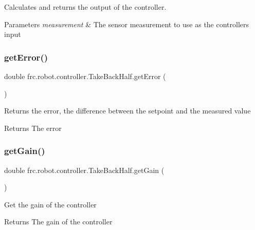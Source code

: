 Calculates and returns the output of the controller.


\begin{DoxyParams}{Parameters}
{\em measurement} & The sensor measurement to use as the controller\textquotesingle{}s input \\
\hline
\end{DoxyParams}
\mbox{\label{classfrc_1_1robot_1_1controller_1_1_take_back_half_a83f8b0c4e447e4d59f84bd8b9e6ac6d6}} 
\subsubsection{\texorpdfstring{getError()}{getError()}}
{\footnotesize\ttfamily double frc.\+robot.\+controller.\+Take\+Back\+Half.\+get\+Error (\begin{DoxyParamCaption}{ }\end{DoxyParamCaption})\hspace{0.3cm}{\ttfamily [inline]}}

Returns the error, the difference between the setpoint and the measured value

\begin{DoxyReturn}{Returns}
The error 
\end{DoxyReturn}
\mbox{\label{classfrc_1_1robot_1_1controller_1_1_take_back_half_acbaafdd8a1c416cab49e222677364a91}} 
\subsubsection{\texorpdfstring{getGain()}{getGain()}}
{\footnotesize\ttfamily double frc.\+robot.\+controller.\+Take\+Back\+Half.\+get\+Gain (\begin{DoxyParamCaption}{ }\end{DoxyParamCaption})\hspace{0.3cm}{\ttfamily [inline]}}

Get the gain of the controller

\begin{DoxyReturn}{Returns}
The gain of the controller 
\end{DoxyReturn}
\mbox{\label{classfrc_1_1robot_1_1controller_1_1_take_back_half_a3a308ba222599bcd646b6080414dfc73}} 
